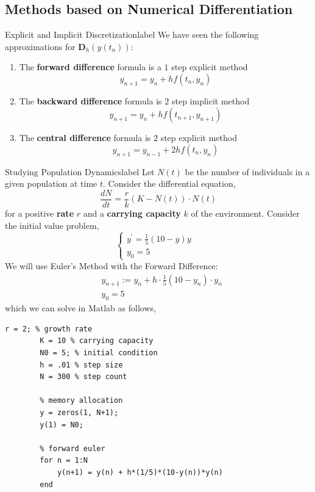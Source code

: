 \subsection{Methods based on Numerical Differentiation}

\begin{ex}{Explicit and Implicit Discretization}{label}
	We have seen the following approximations for $\mathbf{D}_h(y(t_n))$:
	\begin{enumerate}
	\item The \textbf{forward difference} formula is a $1$ step explicit method
	\[y_{n+1}=y_n+h f\left(t_n, y_n\right)\]
	\item The \textbf{backward difference} formula is $2$ step implicit method
	\[y_{n+1}=y_n+h f\left(t_{n+1}, y_{n+1}\right)\]
	\item The \textbf{central difference} formula is $2$ step explicit method
	\[y_{n+1}=y_{n-1}+2 h f\left(t_n, y_n\right)\]
	\end{enumerate}
\end{ex}

\begin{ex}{Studying Population Dynamics}{label}
	Let $N(t)$ be the number of individuals in a given population at time $t$. Consider the differential equation,
	\[\frac{dN}{dt} = \frac{r}{k}(K - N(t)) \cdot N(t)\]
	for a positive \textbf{rate} $r$ and a \textbf{carrying capacity} $k$ of the environment. Consider the initial value problem,
	\[
	\begin{cases}
		y^{\prime} = \frac{1}{5} (10 - y) y &\\
		y_0 = 5 &
	\end{cases}
	\]
	We will use Euler's Method with the Forward Difference:
	\begin{align*}
		&y_{n+1} := y_n + h \cdot \frac{1}{5}(10-y_n) \cdot y_n \\
		&y_0 = 5
	\end{align*}
	which we can solve in Matlab as follows,
	\begin{lstlisting}[style=ExCStyle]
		r = 2; % growth rate
		K = 10 % carrying capacity
		N0 = 5; % initial condition
		h = .01 % step size
		N = 300 % step count

		% memory allocation
		y = zeros(1, N+1);
		y(1) = N0;

		% forward euler
		for n = 1:N
			y(n+1) = y(n) + h*(1/5)*(10-y(n))*y(n)
		end \end{lstlisting}
\end{ex}

